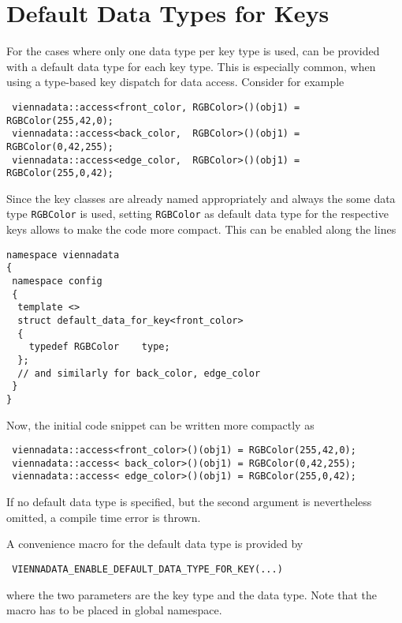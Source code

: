 \section{Default Data Types for Keys} \label{sec:default-valuetype}
For the cases where only one data type per key type is used, {\ViennaData} can be provided with a default data type for each key type.
This is especially common, when using a type-based key dispatch for data access. Consider for example
\begin{lstlisting}
 viennadata::access<front_color, RGBColor>()(obj1) = RGBColor(255,42,0);
 viennadata::access<back_color,  RGBColor>()(obj1) = RGBColor(0,42,255);
 viennadata::access<edge_color,  RGBColor>()(obj1) = RGBColor(255,0,42);
\end{lstlisting}
Since the key classes are already named appropriately and always the some data type \lstinline|RGBColor| is used,
setting \lstinline|RGBColor| as default data type for the respective keys allows to make the code more compact.
This can be enabled along the lines
\begin{lstlisting}
namespace viennadata
{
 namespace config
 {
  template <>
  struct default_data_for_key<front_color>
  {
    typedef RGBColor    type;
  };
  // and similarly for back_color, edge_color
 }
}
\end{lstlisting}
Now, the initial code snippet can be written more compactly as
\begin{lstlisting}
 viennadata::access<front_color>()(obj1) = RGBColor(255,42,0);
 viennadata::access< back_color>()(obj1) = RGBColor(0,42,255);
 viennadata::access< edge_color>()(obj1) = RGBColor(255,0,42);
\end{lstlisting}
If no default data type is specified, but the second argument is nevertheless omitted, a compile time error is thrown.

A convenience macro for the default data type is provided by
\begin{lstlisting}
 VIENNADATA_ENABLE_DEFAULT_DATA_TYPE_FOR_KEY(...)
\end{lstlisting}
where the two parameters are the key type and the data type. Note that the macro has to be placed in global namespace.
